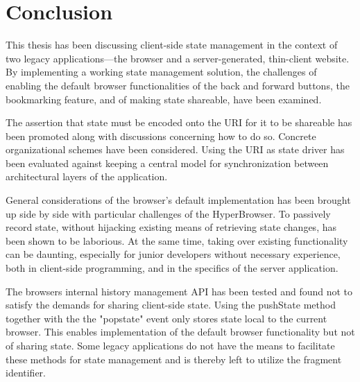 \documentclass[english]{ifimaster}
\begin{document}


\chapter{Conclusion}
This thesis has been discussing client-side state management in the context of two legacy applications---the browser and a server-generated, thin-client website. By implementing a working state management solution, the challenges of enabling the default browser functionalities of the back and forward buttons, the bookmarking feature, and of making state shareable, have been examined. 

The assertion that state must be encoded onto the URI for it to be shareable has been promoted along with discussions concerning how to do so. Concrete organizational schemes have been considered. Using the URI as state driver has been evaluated against keeping a central model for synchronization between architectural layers of the application.  

General considerations of the browser's default implementation has been brought up side by side with particular challenges of the HyperBrowser. To passively record state, without hijacking existing means of retrieving state changes, has been shown to be laborious. At the same time, taking over existing functionality can be daunting, especially for junior developers without necessary experience, both in client-side programming, and in the specifics of the server application. 

The browsers internal history management API has been tested and found not to satisfy the demands for sharing client-side state. Using the pushState method together with the the "popstate" event only stores state local to the current browser. This enables implementation of the default browser functionality but not of sharing state. Some legacy applications do not have the means to facilitate these methods for state management and is thereby left to utilize the fragment identifier. 
\end{document}
